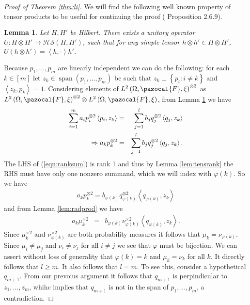 \documentclass[aos]{imsart}
\def\l{\left}
\def\r{\right}
\def\sF{\pazocal{F}}
\def\hs{\mathscr{HS}}
\def\span{\operatorname{span}}
\def\span{\operatorname{span}}
\theoremstyle{plain}
\newtheorem{lem}{Lemma}[section]
\theoremstyle{defintion}
\begin{document}
\begin{proof}[Proof of Theorem \ref{thm:li}]
		We will find the following well known property of tensor products to be useful for continuing the proof (\cite{kadison83} Proposition 2.6.9).
		\begin{lem} \label{lem:hstens}
			Let $H,H'$ be Hilbert. There exists a unitary operator $U:H\otimes H' \to \hs\left( H,H' \right)$, such that for any simple tensor $h\otimes h' \in H\otimes H'$, $U\left( h\otimes h' \right) = \l<h,\cdot\r> h'$.
		\end{lem}
		Because $p_1,\ldots,p_m$ are linearly independent we can do the following: for each $k \in \left[ m \right]$ let $z_k \in \span\left( p_1,\ldots,p_m \right)$ be such that $z_k \perp \left\{ p_i: i \neq k \right\}$ and $\l<z_k,p_k\r> =1$. Considering elements of $L^2\left( \Omega,\sF, \xi \right)^{\otimes 3}$ as $L^2\left( \Omega,\sF, \xi \right)^{\otimes 2} \otimes L^2\left( \Omega,\sF, \xi \right)$, from Lemma \ref{lem:hstens} we have 
		\begin{eqnarray}\label{eqn:ranksum}
			\notag \sum_{i=1}^m a_i p_i^{\otimes 2}\l<p_i,z_k\r>   &=& \sum_{j=1}^l b_j q_j^{\otimes 2} \l<q_j,z_k\r>\\
			\Rightarrow a_k p_k^{\otimes 2}  &=& \sum_{j=1}^l b_j q_j^{\otimes 2} \l<q_j,z_k\r>.
		\end{eqnarray}
		The LHS of (\ref{eqn:ranksum}) is rank 1 and thus by Lemma \ref{lem:tensrank} the RHS must have only one nonzero summand, which we will index with $\varphi\l(k\r)$. So we have
		\begin{eqnarray*}
			a_k p_k^{\otimes 2} = b_{\varphi\left( k \right)} q_{\varphi\left( k \right)}^{\otimes 2} \l<q_{\varphi\left( k \right)},z_k\r>
		\end{eqnarray*}
		and from Lemma \ref{lem:radprod} we have
		\begin{eqnarray}
			\label{eqn:li} a_k \mu_k^{\times 2} &=& b_{\varphi\left( k \right)} \nu_{\varphi\left( k \right)}^{\times 2}\l<q_{\varphi\left( k \right)},z_k\r>.
		\end{eqnarray}
		Since $\mu_k^{\times 2}$ and $\nu_{\varphi\left( k \right)}^{\times 2}$ are both probability measures it follows that $\mu_k = \nu_{\varphi\left( k \right)}$. Since $\mu_i \neq \mu_j$ and $\nu_i \neq \nu_j$ for all $i\neq j$ we see that $\varphi$ must be bijection. We can assert without loss of generality that $\varphi(k) = k$ and $\mu_k = \nu_k$ for all $k$. It directly follows that $l\ge m$. It also follows that $l=m$. To see this, consider a hypothetical $q_{m+1}$. From our prevoius argument it follows that $q_{m+1}$ is perpindicular to $z_1,\ldots, z_m$, whihc implies that $q_{m+1}$ is not in the span of $p_1,\ldots,p_m$, a contradiction.
		

\end{proof}
\end{document}
